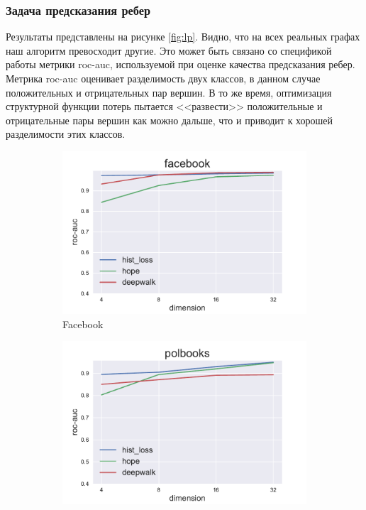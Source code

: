 \documentclass[12pt,a4paper]{extarticle}
\begin{document}
    \subsubsection{Задача предсказания ребер}

    Результаты представлены на рисунке \ref{fig:lp}. Видно, что на всех реальных графах наш алгоритм превосходит другие. Это может быть связано со спецификой работы метрики roc-auc, используемой при оценке качества предсказания ребер.
    Метрика roc-auc оценивает разделимость двух классов, в данном случае положительных и отрицательных пар вершин. В то же время, оптимизация структурной функции потерь пытается <<развести>> положительные и отрицательные пары вершин как можно дальше, что и приводит к хорошей разделимости этих классов.
    
    \begin{figure}
    \begin{subfigure}{.5\linewidth}
    \centering
    \includegraphics[width=\linewidth]{src/images/Link_prediction_facebook.pdf}
    \caption{Facebook}
    \label{fig:lp_face}
    \end{subfigure}
    \begin{subfigure}{.5\linewidth}
    \centering
    \includegraphics[width=\linewidth]{src/images/Link_prediction_polbooks.pdf}

\end{subfigure}
\end{figure}
\end{document}
